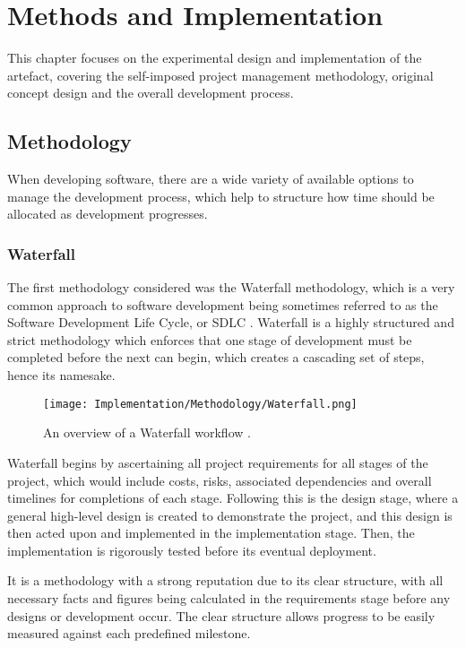 \chapter{Methods and Implementation}
This chapter focuses on the experimental design and implementation of the artefact,
covering the self-imposed project management methodology, original concept design 
and the overall development process.

\section{Methodology}
When developing software, there are a wide variety of available options to manage the development 
process, which help to structure how time should be allocated as development progresses. 

\subsection{Waterfall} 
\para The first methodology considered was the Waterfall methodology, which is a very common 
approach to software development being sometimes referred to as the Software Development Life Cycle, or SDLC \autocite{adobePopularProjectManagement2023}.
Waterfall is a highly structured and strict methodology which enforces that one stage of development must be completed before the next can begin,
which creates a cascading set of steps, hence its namesake.

\begin{figure}[H]
    \centering
    \texttt{[image: Implementation/Methodology/Waterfall.png]}
    \caption{An overview of a Waterfall workflow \autocite{adobeWaterfallMethodologyProject}. \label{fig:Waterfall}}
\end{figure}

\noindent Waterfall begins by ascertaining all project requirements for all stages of the project, which 
would include costs, risks, associated dependencies and overall timelines for completions of each stage.
Following this is the design stage, where a general high-level design is created to demonstrate the 
project, and this design is then acted upon and implemented in the implementation stage. Then, the 
implementation is rigorously tested before its eventual deployment.

\para It is a methodology with a strong reputation due to its clear structure, with all necessary facts and figures 
being calculated in the requirements stage before any designs or development occur. The clear structure allows 
progress to be easily measured against each predefined milestone.

